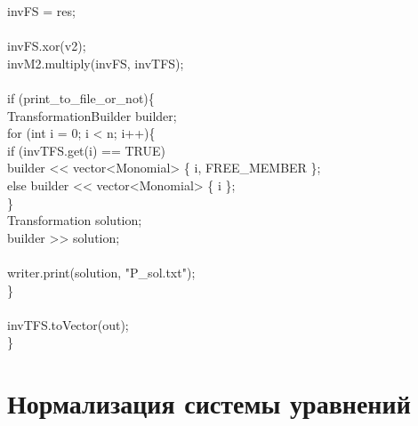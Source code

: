 	invFS = res;\\
	\\
	invFS.xor(v2);\\
	invM2.multiply(invFS, invTFS);\\
	\\
	if (print\_to\_file\_or\_not)\{\\
		TransformationBuilder builder;\\
		for (int i = 0; i < n; i++)\{\\
			if (invTFS.get(i) == TRUE)\\
			builder << vector<Monomial> \{ i, FREE\_MEMBER \};\\
			else 
			builder << vector<Monomial> \{ i \};\\
		\}\\
		Transformation solution;\\
		builder >> solution;\\
		\\
		writer.print(solution, "P\_sol.txt");\\
	\}\\
	\\
	invTFS.toVector(out);\\
\}\\


\section{Нормализация системы уравнений}

